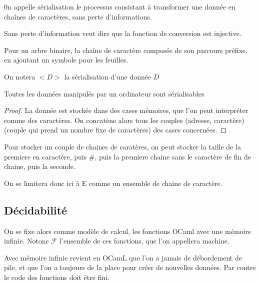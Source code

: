 \begin{definition}
	0n appelle sérialisation le processus consistant à transformer une donnée en chaînes de caractères, sans perte d'informations.
\end{definition}

\begin{rem}
	Sans perte d'information veut dire que la fonction de conversion est injective.
\end{rem}

\begin{example}
	Pour un arbre binaire, la chaîne de caractère composée de son parcours préfixe, en ajoutant un symbole pour les feuilles.
\end{example}

\begin{syntaxe}
	On notera $<D>$ la sérialisation d'une donnée $D$
\end{syntaxe}

\begin{principe}
	Toutes les données manipulés par un ordinateur sont sérialisables
\end{principe}
\begin{proof}
	La donnée est stockée dans des cases mémoires, que l'on peut interpréter comme des caractères. On concatène alors tous les couples (adresse, caractère) (couple qui prend un nombre fixe de caractères) des cases concernées.
\end{proof}

\begin{example}
	Pour stocker un couple de chaines de caratères, on peut stocker la taille de la premiere en caractère, puis \#, puis la premiere chaine sans le caractère de fin de chaine, puis la seconde.
\end{example}

On se limitera donc ici à E comme un ensemble de chaine de caractère.

\subsection{Décidabilité}

On se fixe alors comme modèle de calcul, les fonctions OCaml avec une mémoire infinie. Notons $\mathcal F$ l'ensemble de ces fonctions, que l'on appellera machine.

\begin{rem}
	Avec mémoire infinie revient en OCamL que l'on a jamais de débordement de pile, et que l'on a toujours de la place pour créer de nouvelles données. Par contre le code des fonctions doit être fini.
\end{rem}

